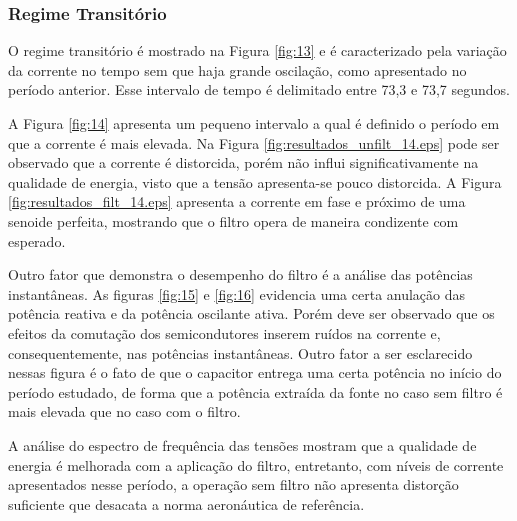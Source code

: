 \FloatBarrier

\subsubsection{Regime Transitório}

O regime transitório é mostrado na Figura \ref{fig:13} e é caracterizado pela variação da corrente no tempo sem que haja grande oscilação, como apresentado no período anterior. Esse intervalo de tempo é delimitado entre 73,3 e 73,7 segundos.

A Figura \ref{fig:14} apresenta um pequeno intervalo a qual é definido o período em que a corrente é mais elevada. Na Figura \ref{fig:resultados_unfilt_14.eps} pode ser observado que a corrente é distorcida, porém não influi significativamente na qualidade de energia, visto que a tensão apresenta-se pouco distorcida. A Figura \ref{fig:resultados_filt_14.eps} apresenta a corrente em fase e próximo de uma senoide perfeita, mostrando que o filtro opera de maneira condizente com esperado. 

Outro fator que demonstra o desempenho do filtro é a análise das potências instantâneas. As figuras \ref{fig:15} e \ref{fig:16} evidencia uma certa anulação das potência reativa e da potência oscilante ativa. Porém deve ser observado que os efeitos da comutação dos semicondutores inserem ruídos na corrente e, consequentemente, nas potências instantâneas. Outro fator a ser esclarecido nessas figura é o fato de que o capacitor entrega uma certa potência no início do período estudado, de forma que a potência extraída da fonte no caso sem filtro é mais elevada que no caso com o filtro.

A análise do espectro de frequência das tensões mostram que a qualidade de energia é melhorada com a aplicação do filtro, entretanto, com níveis de corrente apresentados nesse período, a operação sem filtro não apresenta distorção suficiente que desacata a norma aeronáutica de referência.

